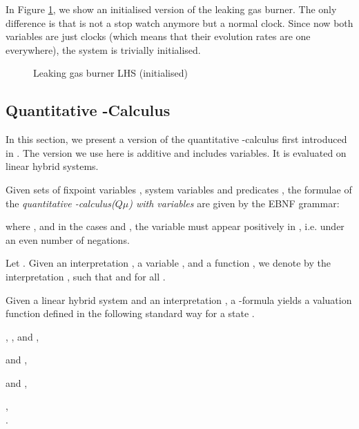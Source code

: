 \documentclass[fleqn,envcountsame]{LMCS}
\newcommand{\ie}{i.e.\xspace}
\newcommand{\muc}{-calculus\xspace}
\newcommand{\Qmu}{\ensuremath{Q\mu}\xspace}
\begin{document}
\begin{exa}
In Figure \ref{leaking}, we show an initialised version of the leaking gas burner.
The only difference is that  is not a stop watch anymore but a normal
clock. Since now both variables are just clocks (which means that their
evolution rates are one everywhere), the system is trivially initialised.

\begin{figure}
\begin{center}
\end{center}
\caption{Leaking gas burner LHS  (initialised)}\label{leaking}
\end{figure}
\end{exa}

\subsection{Quantitative -Calculus}
In this section, we present a version of the quantitative -calculus first
introduced in \cite{FGK10}.
The version we use here is additive and includes variables. It is evaluated on
linear hybrid systems.

\begin{defi}
Given sets of fixpoint variables , system variables  and predicates ,
the formulae of the \emph{quantitative \muc (\Qmu) with variables}
are given by the EBNF grammar:

where , and in the cases
 and , the variable  must appear positively
in , \ie under an even number of negations.
\end{defi}


Let .
Given an interpretation ,
a variable , and a function , we denote by
 the interpretation ,
such that  and 
for all .

\begin{defi}
Given a linear hybrid system
 and an interpretation
, a -formula yields a valuation
function  defined in the following standard
way for a state .
\begin{iteMize}{}
\item , 
      , and
      , 
\item  and
      ,
\item  and
      ,
\item ,\\
  .
\end{iteMize}
\end{defi}
\end{document}
